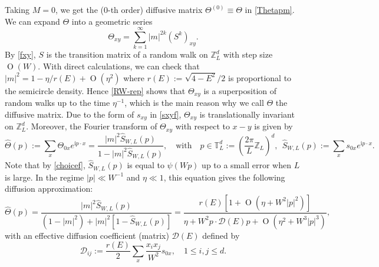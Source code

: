 \documentclass{article}
\newcommand{\1}{\mathds{1}}
\numberwithin{equation}{section}
\newcommand{\be}{\begin{equation}}
\newcommand{\ee}{\end{equation}}
\renewcommand{\cal}{\mathcal}
\newcommand{\wh}{\widehat}
\newcommand{\ii}{\mathrm{i}} %
\renewcommand{\leq}{\leqslant}
\renewcommand{\le}{\leq}
\newcommand{\Z}{\mathbb{Z}}
\DeclareMathOperator{\OO}{O}
\theoremstyle{plain} %
\theoremstyle{remark}
\begin{document}
Taking $M=0$, we get the (0-th order) diffusive matrix $\Theta^{(0)} \equiv \Theta$ in \eqref{Thetapm}.
We can expand $\Theta$ into a geometric series 
\be\label{RW-rep}
\Theta_{xy}= \sum_{k=1}^\infty |m|^{2k}(S^{k})_{xy}.
\ee   
By \eqref{fxy}, $S$ is the transition matrix of a random walk on $\Z_L^d$ with step size $\OO(W)$. With direct calculations, we can check that $|m|^2 =  1- \eta/r(E) +\OO(\eta^2)$ where $r(E):=\sqrt{4-E^2}/2$ is proportional to the semicircle density. Hence \eqref{RW-rep} shows that $\Theta_{xy}$ is a superposition of random walks up to the time $\eta^{-1}$, which is the main reason why we call $\Theta$ the diffusive matrix. Due to the form of $s_{xy}$ in \eqref{sxyf}, $\Theta_{xy}$ is translationally invariant on $\Z_L^d$. Moreover, the Fourier transform of $\Theta_{xy}$ with respect to $x-y$ 
is given by  
\be\nonumber
\wh\Theta(p):=  \sum_x \Theta_{0x} e^{\ii p \cdot x} = \frac{|m|^2 \wh S_{W,L}(p)}{1- |m|^2 \wh S_{W,L}(p)},\quad \text{with} \quad p\in  \mathbb T_L^d:=\left(\frac{2\pi }{L}\Z_L\right)^d, \ \ \wh S_{W,L}(p):= \sum_x s_{0x} e^{\ii p \cdot x}.
\ee
Note that by \eqref{choicef}, $\wh S_{W,L}(p)$ is equal to $\psi(Wp)$ up to a small error when $L$ is large. In the regime $|p|\ll W^{-1}$ and $\eta\ll 1$, this equation gives the following diffusion approximation: %
\be\label{diffu_Theta}
\wh\Theta(p) = \frac{|m|^2 \wh S_{W,L}(p)}{(1- |m|^2) + |m|^2[1-\wh S_{W,L}(p)]}= \frac{r(E) \left[1+\OO(\eta+W^2 |p|^2)\right]}{\eta+ W^2 p\cdot \cal D(E) p + \OO(\eta^2 + W^3|p|^3)},
\ee
with an effective diffusion coefficient (matrix) $ \cal D(E)$ defined by
$$ \cal D_{ij} :=\frac{r(E) }{2}\sum_{x}\frac{x_i x_j}{W^2}s_{0x},\quad 1\le i, j \le d. %
$$
\end{document}
